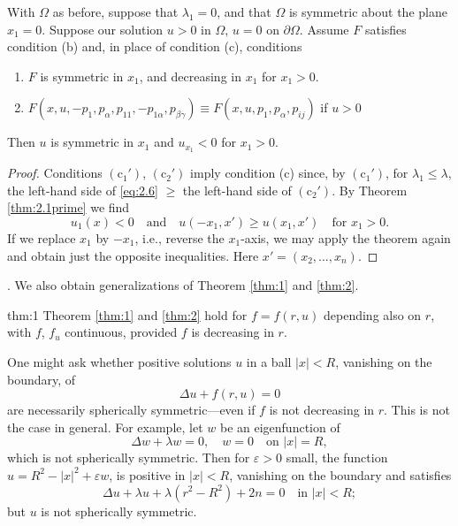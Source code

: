 \begin{corollary}\label{cor:1}
  With $\Omega$ as before, suppose that $\lambda_1=0$,
  and that $\Omega$ is symmetric about the plane $x_1=0$.
  Suppose our solution $u>0$ in $\Omega$, $u=0$ on $\partial\Omega$.
  Assume $F$ satisfies condition (b) and, in place of condition (c), conditions
  \begin{enumerate}[label = $(\mathrm{c}_{\arabic*}')$]
    \item $F$ is symmetric in $x_1$, and decreasing in $x_1$ for $x_1>0$.
    \item $F(x,u,-p_1,p_{\alpha},p_{11},-p_{1\alpha}, p_{\beta\gamma})
      \equiv F(x,u,p_1,p_\alpha,p_{ij})$ if $u>0$
  \end{enumerate}
  Then $u$ is symmetric in $x_1$ and $u_{x_1}<0$ for $x_1>0$.
\end{corollary}

\begin{proof}
  Conditions $(\mathrm{c}_1')$, $(\mathrm{c}_2')$ imply condition (c)
  since, by $(\mathrm{c}_1')$, for $\lambda_1\leq\lambda$,
  the left-hand side of \eqref{eq:2.6} $\geq$ the left-hand side of $(\mathrm{c}_2')$.
  By Theorem \ref{thm:2.1prime} we find
  \[u_1(x) < 0\quad \text{and} \quad u(-x_1, x') \geq u(x_1,x')
    \quad\text{for } x_1>0.\]
  If we replace $x_1$ by $-x_1$, i.e., reverse the $x_1$-axis,
  we may apply the theorem again and obtain just the opposite inequalities.
  Here $x' = (x_2,\ldots, x_n)$.
\end{proof}

. We also obtain generalizations of Theorem \ref{thm:1} and \ref{thm:2}.

\begin{theoremp}{thm:1}\label{thm:1prime}
  Theorem \ref{thm:1} and \ref{thm:2} hold for $f=f(r,u)$
  depending also on $r$, with $f$, $f_u$ continuous, provided $f$ is decreasing in $r$.
\end{theoremp}

One might ask whether positive solutions $u$ in a ball $|x|<R$,
vanishing on the boundary, of
\[\Delta u + f(r,u) = 0\]
are necessarily spherically symmetric---even if $f$ is not decreasing in $r$.
This is not the case in general. For example, let $w$ be an eigenfunction of
\[\Delta w + \lambda w = 0,\quad w = 0\quad \text{on } |x|=R,\]
which is not spherically symmetric. Then for $\varepsilon>0$ small, the function
$u = R^2 - |x|^2 + \varepsilon w$, is positive in $|x|<R$,
vanishing on the boundary and satisfies
\[\Delta u + \lambda u + \lambda(r^2-R^2) + 2n = 0\quad\text{in } |x|<R;\]
but $u$ is not spherically symmetric.

